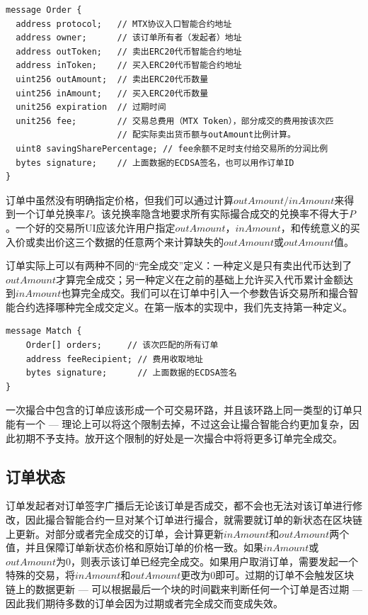 \documentclass[UTF8,nofonts]{ctexart}
\begin{document}
\begin{verbatim}
message Order {
  address protocol;   // MTX协议入口智能合约地址
  address owner;      // 该订单所有者（发起者）地址
  address outToken;   // 卖出ERC20代币智能合约地址
  address inToken;    // 买入ERC20代币智能合约地址
  uint256 outAmount;  // 卖出ERC20代币数量
  uint256 inAmount;   // 买入ERC20代币数量
  unit256 expiration  // 过期时间
  unit256 fee;        // 交易总费用（MTX Token），部分成交的费用按该次匹
                      // 配实际卖出货币额与outAmount比例计算。
  uint8 savingSharePercentage; // fee余额不足时支付给交易所的分润比例
  bytes signature;    // 上面数据的ECDSA签名，也可以用作订单ID
}	
\end{verbatim}

订单中虽然没有明确指定价格，但我们可以通过计算$outAmount/inAmount$来得到一个订单兑换率$P$。该兑换率隐含地要求所有实际撮合成交的兑换率不得大于$P$。一个好的交易所UI应该允许用户指定$outAmount$，$inAmount$，和传统意义的买入价或卖出价这三个数据的任意两个来计算缺失的$outAmount$或$outAmount$值。

订单实际上可以有两种不同的“完全成交”定义：一种定义是只有卖出代币达到了$outAmount$才算完全成交；另一种定义在之前的基础上允许买入代币累计金额达到$inAmount$也算完全成交。我们可以在订单中引入一个参数告诉交易所和撮合智能合约选择哪种完全成交定义。在第一版本的实现中，我们先支持第一种定义。

\begin{verbatim}
message Match {
    Order[] orders;     // 该次匹配的所有订单
    address feeRecipient; // 费用收取地址
    bytes signature;      // 上面数据的ECDSA签名
}
\end{verbatim}

一次撮合中包含的订单应该形成一个可交易环路，并且该环路上同一类型的订单只能有一个 --- 理论上可以将这个限制去掉，不过这会让撮合智能合约更加复杂，因此初期不予支持。放开这个限制的好处是一次撮合中将将更多订单完全成交。

\subsection{订单状态\label{sec:orderstate}}

订单发起者对订单签字广播后无论该订单是否成交，都不会也无法对该订单进行修改，因此撮合智能合约一旦对某个订单进行撮合，就需要就订单的新状态在区块链上更新。对部分或者完全成交的订单，会计算更新$inAmount$和$outAmount$两个值，并且保障订单新状态价格和原始订单的价格一致。如果$inAmount$或$outAmount$为0，则表示该订单已经完全成交。如果用户取消订单，需要发起一个特殊的交易，将$inAmount$和$outAmount$更改为0即可。过期的订单不会触发区块链上的数据更新 --- 可以根据最后一个块的时间戳来判断任何一个订单是否过期 --- 因此我们期待多数的订单会因为过期或者完全成交而变成失效。
\end{document}
